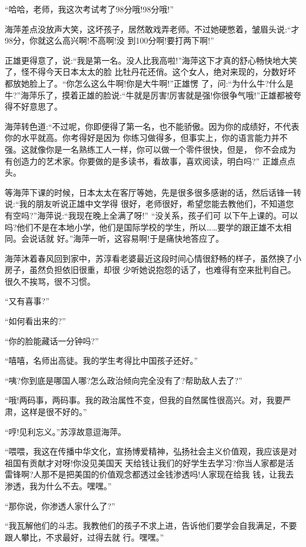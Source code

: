 \documentclass[11pt,a4paper,onecolumn]{article}
\begin{document}
``哈哈，老师，我这次考试考了98分哦!98分哦!''

海萍差点没放声大笑，这坏孩子，居然敢戏弄老师。不过她硬憋着，皱眉头说:``才98分，你就这么高兴啊!不高啊!没
到100分啊!要打两下啊!''

正雄更得意了，说:``我是第一名。没人比我高啦!''海萍这下才真的舒心畅快地大笑了，怪不得今天日本太太的脸
比牡丹花还俏。这个女人，绝对来现的，分数好坏都放她脸上了。``你怎么这么牛啊!你是大牛啊!''正雄愣
了，问:``为什么牛?什么是牛?''海萍乐了，摸着正雄的脸说:``牛就是厉害!厉害就是强!你很争气哦!''正雄都被夸
得不好意思了。

海萍转色道:``不过呢，你即便得了第一名，也不能骄傲。因为你的成绩好，不代表你的水平就高。你考得好是因为
你练习做得多，但事实上，你的语言能力并不强。这就像你是一名熟练工人一样，你可以做一个零件很快，但是，
你不会成为有创造力的艺术家。你要做的是多读书，看故事，喜欢阅读，明白吗?'' 正雄点点头。

等海萍下课的时候，日本太太在客厅等她，先是很多很多感谢的话，然后话锋一转说:``我的朋友听说正雄中文学得
很好，老师很好，希望您能去教他们，不知道您有空吗?''海萍说:``我现在晚上全满了呀!'' ``没关系，孩子们可
以下午上课的。可以吗?他们不是在本地小学，他们是国际学校的学生，所以……要学的跟正雄不太相同。会说话就
好。''海萍一听，这容易啊!于是痛快地答应了。

海萍沐着春风回到家中，苏淳看老婆最近这段时间心情很舒畅的样子，虽然换了小房子，虽然负担依旧很重，却很
少听她说抱怨的话了，也难得有空来批判自己。很久不挨骂，很不习惯。

``又有喜事?''

``如何看出来的?''

``你的脸能藏话一分钟吗?''

``嘻嘻，名师出高徒。我的学生考得比中国孩子还好。''

``咦?你到底是哪国人哪?怎么政治倾向完全没有了?帮助敌人去了?''

``哦!两码事，两码事。我的政治属性不变，但我的自然属性很高兴。对，我要严肃，这样是很不好的。''

``哼!见利忘义。''苏淳故意逗海萍。

``喂喂，我这在传播中华文化，宣扬博爱精神，弘扬社会主义价值观，我应该是对祖国有贡献才对呀!你没见美国天
天给钱让我们的好学生去学习?你当人家都是活雷锋啊?人那不是把美国的价值观念都透过金钱渗透吗!人家现在给我
钱，让我去渗透，我为什么不去。嘿嘿。''

``那你说，你渗透人家什么了?''

``我瓦解他们的斗志。我教他们的孩子不求上进，告诉他们要学会自我满足，不要跟人攀比，不求最好，过得去就
行。嘿嘿。''
\end{document}
